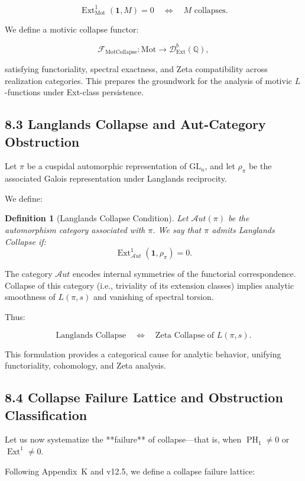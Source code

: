 \documentclass[11pt]{article}
\newtheorem{definition}[theorem]{Definition}
\DeclareMathOperator{\Ext}{Ext}
\DeclareMathOperator{\PH}{PH}
\begin{document}
\[
\Ext^1_{\mathrm{Mot}}(\mathbf{1}, M) = 0 \quad \Leftrightarrow \quad M \text{ collapses.}
\]

We define a motivic collapse functor:

\[
\mathcal{F}_{\mathrm{MotCollapse}} : \mathrm{Mot} \to \mathcal{D}^{b}_{\mathrm{Ext}}(\mathbb{Q}),
\]

satisfying functoriality, spectral exactness, and Zeta compatibility across realization categories.  
This prepares the groundwork for the analysis of motivic $L$-functions under Ext-class persistence.

\subsection{8.3 Langlands Collapse and Aut-Category Obstruction}

Let $\pi$ be a cuspidal automorphic representation of $\mathrm{GL}_n$, and let $\rho_\pi$ be the associated Galois representation under Langlands reciprocity.

We define:

\begin{definition}[Langlands Collapse Condition]
Let $\mathcal{A}ut(\pi)$ be the automorphism category associated with $\pi$.  
We say that $\pi$ admits Langlands Collapse if:
\[
\Ext^1_{\mathcal{A}ut}(\mathbf{1}, \rho_\pi) = 0.
\]
\end{definition}

The category $\mathcal{A}ut$ encodes internal symmetries of the functorial correspondence.  
Collapse of this category (i.e., triviality of its extension classes) implies analytic smoothness of $L(\pi,s)$ and vanishing of spectral torsion.

Thus:

\[
\text{Langlands Collapse} \quad \Leftrightarrow \quad \text{Zeta Collapse of } L(\pi,s).
\]

This formulation provides a categorical cause for analytic behavior, unifying functoriality, cohomology, and Zeta analysis.

\subsection{8.4 Collapse Failure Lattice and Obstruction Classification}

Let us now systematize the **failure** of collapse—that is, when $\PH_1 \neq 0$ or $\Ext^1 \neq 0$.

Following Appendix~K and v12.5, we define a collapse failure lattice:
\end{document}
